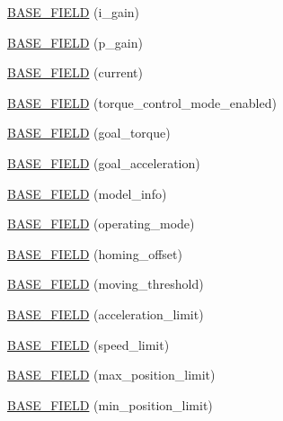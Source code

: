\begin{DoxyCompactItemize}
\hyperlink{classdynamixel_1_1servos_1_1_base_servo_a2f96570d1a8c874bc38bfe53c19d6bba}{B\+A\+S\+E\+\_\+\+F\+I\+E\+L\+D} (i\+\_\+gain)
\item 
\hyperlink{classdynamixel_1_1servos_1_1_base_servo_a49e5eeb24d2f0a56e6450dffd8bd6d9c}{B\+A\+S\+E\+\_\+\+F\+I\+E\+L\+D} (p\+\_\+gain)
\item 
\hyperlink{classdynamixel_1_1servos_1_1_base_servo_a3e081b1577bbe5571cfcf277ebaeb90a}{B\+A\+S\+E\+\_\+\+F\+I\+E\+L\+D} (current)
\item 
\hyperlink{classdynamixel_1_1servos_1_1_base_servo_a828703bacd6f83b91a4c4bbe7cb45d7e}{B\+A\+S\+E\+\_\+\+F\+I\+E\+L\+D} (torque\+\_\+control\+\_\+mode\+\_\+enabled)
\item 
\hyperlink{classdynamixel_1_1servos_1_1_base_servo_af4433354d94851217d5931b528be26a1}{B\+A\+S\+E\+\_\+\+F\+I\+E\+L\+D} (goal\+\_\+torque)
\item 
\hyperlink{classdynamixel_1_1servos_1_1_base_servo_a87f4340b3d3c266be54fe22cb0573128}{B\+A\+S\+E\+\_\+\+F\+I\+E\+L\+D} (goal\+\_\+acceleration)
\item 
\hyperlink{classdynamixel_1_1servos_1_1_base_servo_a534b4f6823ed8c8c2e2b650d76aef90a}{B\+A\+S\+E\+\_\+\+F\+I\+E\+L\+D} (model\+\_\+info)
\item 
\hyperlink{classdynamixel_1_1servos_1_1_base_servo_afe1a1fd0d8a3195fc053186729e493d7}{B\+A\+S\+E\+\_\+\+F\+I\+E\+L\+D} (operating\+\_\+mode)
\item 
\hyperlink{classdynamixel_1_1servos_1_1_base_servo_a3feb535f2ec0d53f4b8dbb873e78875a}{B\+A\+S\+E\+\_\+\+F\+I\+E\+L\+D} (homing\+\_\+offset)
\item 
\hyperlink{classdynamixel_1_1servos_1_1_base_servo_ae380e8c4a76f8377bdb7112b3ad3fa68}{B\+A\+S\+E\+\_\+\+F\+I\+E\+L\+D} (moving\+\_\+threshold)
\item 
\hyperlink{classdynamixel_1_1servos_1_1_base_servo_a17a48b48ed6277f17477656977c373e3}{B\+A\+S\+E\+\_\+\+F\+I\+E\+L\+D} (acceleration\+\_\+limit)
\item 
\hyperlink{classdynamixel_1_1servos_1_1_base_servo_a28a3e801191c864226610c99163b906a}{B\+A\+S\+E\+\_\+\+F\+I\+E\+L\+D} (speed\+\_\+limit)
\item 
\hyperlink{classdynamixel_1_1servos_1_1_base_servo_a8f269d5d442445a4744e6404b5cb2c58}{B\+A\+S\+E\+\_\+\+F\+I\+E\+L\+D} (max\+\_\+position\+\_\+limit)
\item 
\hyperlink{classdynamixel_1_1servos_1_1_base_servo_aaefe353baec0ad45d9310e985da01fd7}{B\+A\+S\+E\+\_\+\+F\+I\+E\+L\+D} (min\+\_\+position\+\_\+limit)
\item 

\end{DoxyCompactItemize}
